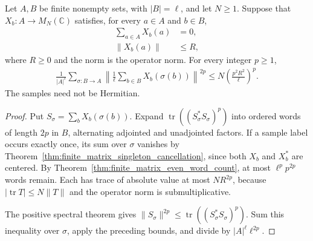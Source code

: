 \begin{theorem}
    \label{thm:finite_matrix_uniform_moment}
    \leanok
    Let $A,B$ be finite nonempty sets, with $|B|=\ell$, and let $N\ge1$.
    Suppose that $X_b:A\to M_N(\mathbb C)$ satisfies, for every $a\in A$ and $b\in B$,
    \begin{align}
        \sum_{a\in A}X_b(a) & =0,    \\
        \|X_b(a)\|          & \le R,
        \label{eq:finite_matrix_centering}
    \end{align}
    where $R\ge0$ and the norm is the operator norm. For every integer $p\ge1$,
    \begin{align}
        \frac1{|A|^\ell}\sum_{\sigma:B\to A}
        \left\|\frac1\ell\sum_{b\in B}X_b(\sigma(b))\right\|^{2p}
        \le N\left(\frac{p^2R^2}{\ell}\right)^p.
        \label{eq:finite_matrix_uniform_moment}
    \end{align}
    The samples need not be Hermitian.
\end{theorem}
\begin{proof}\leanok
    Put $S_\sigma=\sum_bX_b(\sigma(b))$. Expand
    $\operatorname{tr}((S_\sigma^*S_\sigma)^p)$ into ordered words of length
    $2p$ in $B$, alternating adjointed and unadjointed factors.
    If a sample label occurs exactly once, its sum over $\sigma$ vanishes
    by Theorem~\ref{thm:finite_matrix_singleton_cancellation}, since both
    $X_b$ and $X_b^*$ are centered. By Theorem~\ref{thm:finite_matrix_even_word_count},
    at most $\ell^pp^{2p}$ words remain. Each has trace of absolute value
    at most $NR^{2p}$, because $|\operatorname{tr}T|\le N\|T\|$ and the
    operator norm is submultiplicative.

    The positive spectral theorem gives
    $\|S_\sigma\|^{2p}\le\operatorname{tr}((S_\sigma^*S_\sigma)^p)$.
    Sum this inequality over $\sigma$, apply the preceding bounds, and
    divide by $|A|^\ell\ell^{2p}$.
\end{proof}


